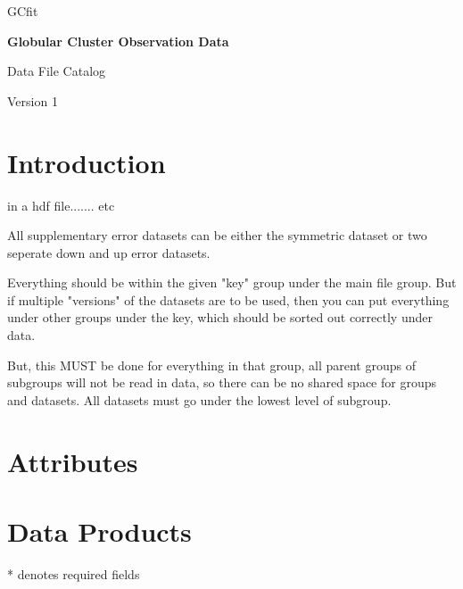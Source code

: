\documentclass[12pt]{article}
\begin{document}
\begin{titlepage}
       \vspace*{2cm}

       \LARGE
        GCfit

       \vspace{2cm}

       \Huge
       \textbf{Globular Cluster Observation Data}

       \vspace{2cm}
        
        \LARGE
        Data File Catalog

       \vspace{1.5cm}

       \vfill

       Version 1
\end{titlepage}

\section{Introduction}

in a hdf file....... etc

All supplementary error datasets can be either the symmetric dataset or two
seperate down and up error datasets.

Everything should be within the given "key" group under the main file group.
But if multiple "versions" of the datasets are to be used, then you can put
everything under other groups under the key, which should be sorted out
correctly under data.

But, this MUST be done for everything in that group, all parent groups of
subgroups will not be read in data, so there can be no shared space for groups
and datasets. All datasets must go under the lowest level of subgroup.

\section{Attributes}



\section{Data Products}


* denotes required fields










\end{document}

